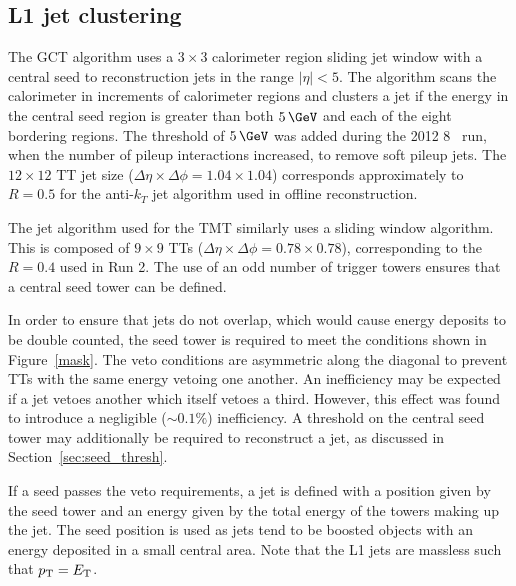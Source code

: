 \subsection{L1 jet clustering}
\label{sec:jet_algo}
The GCT algorithm uses a $3\times3$ calorimeter region sliding jet window with a central seed 
to reconstruction jets in the range $|\eta| < 5$. The algorithm scans the calorimeter in increments
of calorimeter regions and clusters a jet if the energy in the central seed region is greater than 
both $5\,\GeV$ and each of the eight bordering regions. The threshold of $5\,\GeV$ was added during 
the 2012 8 \TeV~run, when the number of pileup interactions increased, to remove soft pileup jets.
The $12\times12$ TT jet size ($\Delta\eta\times\Delta\phi = 1.04\times1.04$) corresponds 
approximately to $R=0.5$ for the anti-$k_T$ jet algorithm used in offline reconstruction.

The jet algorithm used for the TMT similarly uses a sliding window algorithm. This
is composed of $9\times9$ TTs ($\Delta\eta\times\Delta\phi = 0.78\times0.78$), corresponding 
to the $R=0.4$ used in Run 2. The use of an odd number of trigger towers ensures that a central 
seed tower can be defined. 

In order to ensure that jets do not overlap, which would cause energy deposits 
to be double counted, the seed tower is required to meet the conditions
shown in Figure~\ref{mask}. The veto conditions are asymmetric along the diagonal to prevent  
TTs with the same energy vetoing one another. An inefficiency may be expected 
if a jet vetoes another which itself vetoes a third. However, this effect was found to 
introduce a negligible ($\sim0.1\%$) inefficiency. A threshold on the central seed tower may 
additionally be required to reconstruct a jet, as discussed in Section~\ref{sec:seed_thresh}. 

If a seed passes the veto requirements, a jet is defined with a position 
given by the seed tower and an energy given by the total energy of the towers
making up the jet. The seed position is used as jets tend to be boosted
 objects with an energy deposited in a small central area. 
Note that the L1 jets are massless such that ${p_{\text T}} = {E_{\text T}}$.

